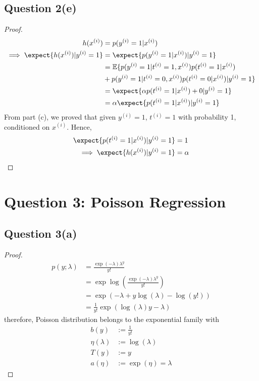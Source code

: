\documentclass[11pt]{article}
\newcommand{\upi}[0]{^{(i)}}
\begin{document}
	\subsection{Question 2(e)}
	\begin{proof}
		\begin{align}
			h(x\upi) &= p(y\upi = 1|x\upi) \\
			\implies \expect{h(x\upi)|y\upi=1} &= \expect{p(y\upi = 1|x\upi)|y\upi=1} \\
			&= \mathbb{E}\{
			p(y\upi = 1|t\upi=1, x\upi) p(t\upi=1|x\upi) \\
			&+ p(y\upi = 1|t\upi=0, x\upi) p(t\upi=0|x\upi)
			|y\upi=1
			\} \\
			&= \expect{\alpha p(t\upi=1|x\upi) + 0|y\upi = 1} \\
			&= \alpha \expect{p(t\upi=1|x\upi)|y\upi=1}
		\end{align}
		From part (c), we proved that given $y\upi=1$, $t\upi=1$ with probability 1, conditioned on $x\upi$. Hence,
		\begin{align}
			\expect{p(t\upi=1|x\upi)|y\upi=1} &= 1 \\
			\implies \expect{h(x\upi)|y\upi=1} &= \alpha
		\end{align}
	\end{proof}
	
	\newpage
	
	\section{Question 3: Poisson Regression}
	\subsection{Question 3(a)}
	\begin{proof}
		\begin{align}
			p(y; \lambda) &= \frac{\exp(-\lambda) \lambda^y}{y!} \\
			&= \exp \log (\frac{\exp(-\lambda) \lambda^y}{y!}) \\
			&= \exp \left (
				- \lambda + y \log (\lambda) - \log(y!)
			\right ) \\
			&= \frac{1}{y!} \exp(\log(\lambda) y - \lambda)
		\end{align}
		therefore, Poisson distribution belongs to the exponential family with
		\begin{align}
			b(y) &:= \frac{1}{y!} \\
			\eta(\lambda) &:= \log(\lambda) \\
			T(y) &:= y \\
			a(\eta) &:= \exp(\eta) = \lambda
		\end{align}
	\end{proof}
	\newpage
	
\end{document}
